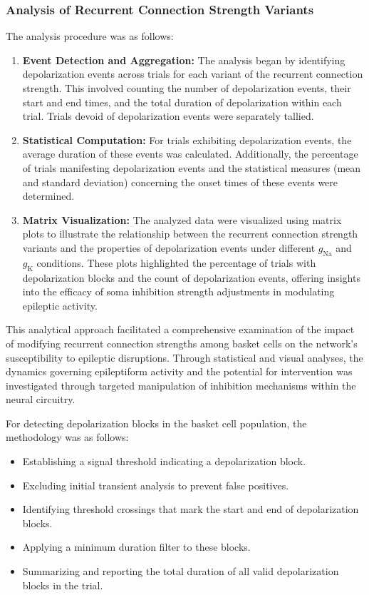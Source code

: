 \subsubsection{Analysis of Recurrent Connection Strength Variants}
\noindent The analysis procedure was as follows:
\begin{enumerate}
    \item \textbf{Event Detection and Aggregation:} The analysis began by identifying depolarization events across trials for each variant of the recurrent connection strength. This involved counting the number of depolarization events, their start and end times, and the total duration of depolarization within each trial. Trials devoid of depolarization events were separately tallied.

    \item \textbf{Statistical Computation:} For trials exhibiting depolarization events, the average duration of these events was calculated. Additionally, the percentage of trials manifesting depolarization events and the statistical measures (mean and standard deviation) concerning the onset times of these events were determined.

    \item \textbf{Matrix Visualization:} The analyzed data were visualized using matrix plots to illustrate the relationship between the recurrent connection strength variants and the properties of depolarization events under different \(g_{\text{Na}}\) and \(g_{\text{K}}\) conditions. These plots highlighted the percentage of trials with depolarization blocks and the count of depolarization events, offering insights into the efficacy of soma inhibition strength adjustments in modulating epileptic activity.
\end{enumerate}

\noindent
This analytical approach facilitated a comprehensive examination of the impact of modifying recurrent connection strengths among basket cells on the network's susceptibility to epileptic disruptions.
Through statistical and visual analyses, the dynamics governing epileptiform activity and the potential for intervention was investigated through targeted manipulation of inhibition mechanisms within the neural circuitry.
\pagebreak

\noindent For detecting depolarization blocks in the basket cell population, the
methodology was as follows:
\begin{itemize}
    \item Establishing a signal threshold indicating a depolarization block.
    \item Excluding initial transient analysis to prevent false positives.
    \item Identifying threshold crossings that mark the start and end of depolarization
          blocks.
    \item Applying a minimum duration filter to these blocks.
    \item Summarizing and reporting the total duration of all valid depolarization blocks
          in the trial.
\end{itemize}

